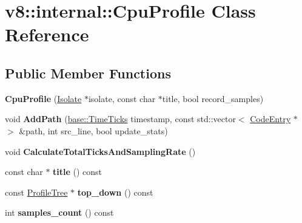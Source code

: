 \hypertarget{classv8_1_1internal_1_1_cpu_profile}{}\section{v8\+:\+:internal\+:\+:Cpu\+Profile Class Reference}
\label{classv8_1_1internal_1_1_cpu_profile}
\subsection*{Public Member Functions}
\begin{DoxyCompactItemize}
\item 
{\bfseries Cpu\+Profile} (\hyperlink{classv8_1_1internal_1_1_isolate}{Isolate} $\ast$isolate, const char $\ast$title, bool record\+\_\+samples)\hypertarget{classv8_1_1internal_1_1_cpu_profile_ad8b0d27fe587626d41426f42f12e0013}{}\label{classv8_1_1internal_1_1_cpu_profile_ad8b0d27fe587626d41426f42f12e0013}

\item 
void {\bfseries Add\+Path} (\hyperlink{classv8_1_1base_1_1_time_ticks}{base\+::\+Time\+Ticks} timestamp, const std\+::vector$<$ \hyperlink{classv8_1_1internal_1_1_code_entry}{Code\+Entry} $\ast$ $>$ \&path, int src\+\_\+line, bool update\+\_\+stats)\hypertarget{classv8_1_1internal_1_1_cpu_profile_a2e91849226ab37b65084e1900a93d1c1}{}\label{classv8_1_1internal_1_1_cpu_profile_a2e91849226ab37b65084e1900a93d1c1}

\item 
void {\bfseries Calculate\+Total\+Ticks\+And\+Sampling\+Rate} ()\hypertarget{classv8_1_1internal_1_1_cpu_profile_a67be15ade6a71de1c77bb568e9180d03}{}\label{classv8_1_1internal_1_1_cpu_profile_a67be15ade6a71de1c77bb568e9180d03}

\item 
const char $\ast$ {\bfseries title} () const \hypertarget{classv8_1_1internal_1_1_cpu_profile_a0634fcde82c4f1699dc026034438f46b}{}\label{classv8_1_1internal_1_1_cpu_profile_a0634fcde82c4f1699dc026034438f46b}

\item 
const \hyperlink{classv8_1_1internal_1_1_profile_tree}{Profile\+Tree} $\ast$ {\bfseries top\+\_\+down} () const \hypertarget{classv8_1_1internal_1_1_cpu_profile_a220ed4be019cefa14c9efcacbcf1e0d4}{}\label{classv8_1_1internal_1_1_cpu_profile_a220ed4be019cefa14c9efcacbcf1e0d4}

\item 
int {\bfseries samples\+\_\+count} () const \hypertarget{classv8_1_1internal_1_1_cpu_profile_a4ef585c002c36e0ca8aaa8ec41ab5821}{}\label{classv8_1_1internal_1_1_cpu_profile_a4ef585c002c36e0ca8aaa8ec41ab5821}


\end{DoxyCompactItemize}
